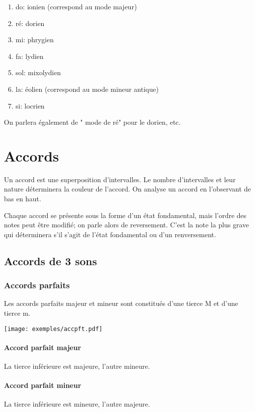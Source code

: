\documentclass[11pt]{scrreprt}
\begin{document}
\begin{enumerate}
\item do: ionien (correspond au mode majeur)
\item ré: dorien
\item mi: phrygien
\item fa: lydien
\item sol: mixolydien
\item la: éolien (correspond au mode mineur antique)
\item si: locrien
\end{enumerate}


On parlera également de " mode de ré" pour le dorien, etc.


\chapter{Accords}
Un accord est une superposition d'intervalles. Le nombre d'intervalles et leur nature déterminera la couleur de l'accord. On analyse un accord en l'observant de bas en haut.

Chaque accord se présente sous la forme d'un état fondamental, mais l'ordre des notes peut être modifié; on parle alors de reversement. C'est la note la plus grave qui déterminera s'il s'agit de l'état fondamental ou d'un renversement.
\section{Accords de 3 sons}
\subsection{Accords parfaits}
Les accords parfaits majeur et mineur sont constitués d'une tierce M et d'une tierce m.
\begin{center}
   \texttt{[image: exemples/accpft.pdf]}
\end{center}


\subsubsection{Accord parfait majeur}\label{pftmaj}
La tierce inférieure est majeure, l'autre mineure.

\subsubsection{Accord parfait mineur}
La tierce inférieure est mineure, l'autre majeure.
\end{document}

